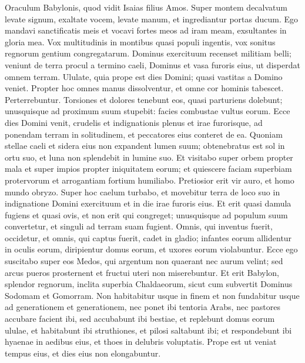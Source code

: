 \begin{biblechapter}  
\verse Oraculum Babylonis, quod vidit Isaias filius Amos. 
\verse Super montem decalvatum levate signum, exaltate vocem, levate manum, et ingrediantur portas ducum. 
\verse Ego mandavi sanctificatis meis et vocavi fortes meos ad iram meam, exsultantes in gloria mea. 
\verse Vox multitudinis in montibus quasi populi ingentis, vox sonitus regnorum gentium congregatarum. Dominus exercituum recenset militiam belli; 
\verse veniunt de terra procul a termino caeli, Dominus et vasa furoris eius, ut disperdat omnem terram. 
\verse Ululate, quia prope est dies Domini; quasi vastitas a Domino veniet. 
\verse Propter hoc omnes manus dissolventur, et omne cor hominis tabescet. 
\verse Perterrebuntur. Torsiones et dolores tenebunt eos, quasi parturiens dolebunt; unusquisque ad proximum suum stupebit: facies combustae vultus eorum. 
\verse Ecce dies Domini venit, crudelis et indignationis plenus et irae furorisque, ad ponendam terram in solitudinem, et peccatores eius conteret de ea. 
\verse Quoniam stellae caeli et sidera eius non expandent lumen suum; obtenebratus est sol in ortu suo, et luna non splendebit in lumine suo. 
\verse Et visitabo super orbem propter mala et super impios propter iniquitatem eorum; et quiescere faciam superbiam protervorum et arrogantiam fortium humiliabo. 
\verse Pretiosior erit vir auro, et homo mundo obryzo. 
\verse Super hoc caelum turbabo, et movebitur terra de loco suo in indignatione Domini exercituum et in die irae furoris eius. 
\verse Et erit quasi damula fugiens et quasi ovis, et non erit qui congreget; unusquisque ad populum suum convertetur, et singuli ad terram suam fugient. 
\verse Omnis, qui inventus fuerit, occidetur, et omnis, qui captus fuerit, cadet in gladio; 
\verse infantes eorum allidentur in oculis eorum, diripientur domus eorum, et uxores eorum violabuntur. 
\verse Ecce ego suscitabo super eos Medos, qui argentum non quaerant nec aurum velint; 
\verse sed arcus pueros prosternent et fructui uteri non miserebuntur. 
\verse Et erit Babylon, splendor regnorum, inclita superbia Chaldaeorum, sicut cum subvertit Dominus Sodomam et Gomorram. 
\verse Non habitabitur usque in finem et non fundabitur usque ad generationem et generationem, nec ponet ibi tentoria Arabs, nec pastores accubare facient ibi, 
\verse sed accubabunt ibi bestiae, et replebunt domus eorum ululae, et habitabunt ibi struthiones, et pilosi saltabunt ibi; 
\verse et respondebunt ibi hyaenae in aedibus eius, et thoes in delubris voluptatis. Prope est ut veniat tempus eius, et dies eius non elongabuntur. 
\end{biblechapter}

